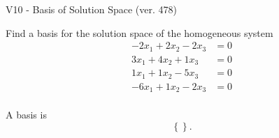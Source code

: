 \begin{exercise}
  \begin{exerciseTitle}V10 - Basis of Solution Space (ver. 478)\end{exerciseTitle}
  \begin{exerciseStatement}
    Find a basis for the solution space of the homogeneous system 
\begin{align*}
 -2 x_ 1 + 2 x_ 2 -2 x_ 3 &= 0  \\ 
  3 x_ 1 + 4 x_ 2 + 1 x_ 3 &= 0  \\ 
  1 x_ 1 + 1 x_ 2 -5 x_ 3 &= 0  \\ 
  -6 x_ 1 + 1 x_ 2 -2 x_ 3 &= 0  \\ 
 \end{align*}


 
  \end{exerciseStatement}

  \begin{exerciseAnswer}
   A basis is   
\[\left\{\right\}.\]

  


  \end{exerciseAnswer}
\end{exercise}